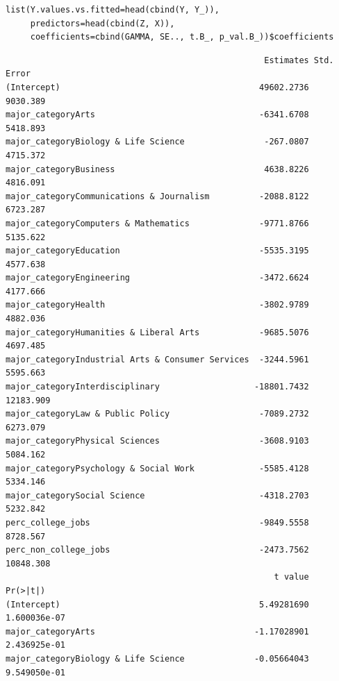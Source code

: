 \documentclass[10pt, twoside, openleft]{article}
\begin{document}
\begin{verbatim}
list(Y.values.vs.fitted=head(cbind(Y, Y_)),
     predictors=head(cbind(Z, X)),
     coefficients=cbind(GAMMA, SE.., t.B_, p_val.B_))$coefficients
\end{verbatim}

\begin{verbatim}
                                                    Estimates Std. Error
(Intercept)                                        49602.2736   9030.389
major_categoryArts                                 -6341.6708   5418.893
major_categoryBiology & Life Science                -267.0807   4715.372
major_categoryBusiness                              4638.8226   4816.091
major_categoryCommunications & Journalism          -2088.8122   6723.287
major_categoryComputers & Mathematics              -9771.8766   5135.622
major_categoryEducation                            -5535.3195   4577.638
major_categoryEngineering                          -3472.6624   4177.666
major_categoryHealth                               -3802.9789   4882.036
major_categoryHumanities & Liberal Arts            -9685.5076   4697.485
major_categoryIndustrial Arts & Consumer Services  -3244.5961   5595.663
major_categoryInterdisciplinary                   -18801.7432  12183.909
major_categoryLaw & Public Policy                  -7089.2732   6273.079
major_categoryPhysical Sciences                    -3608.9103   5084.162
major_categoryPsychology & Social Work             -5585.4128   5334.146
major_categorySocial Science                       -4318.2703   5232.842
perc_college_jobs                                  -9849.5558   8728.567
perc_non_college_jobs                              -2473.7562  10848.308
                                                      t value     Pr(>|t|)
(Intercept)                                        5.49281690 1.600036e-07
major_categoryArts                                -1.17028901 2.436925e-01
major_categoryBiology & Life Science              -0.05664043 9.549050e-01

\end{verbatim}
\end{document}
